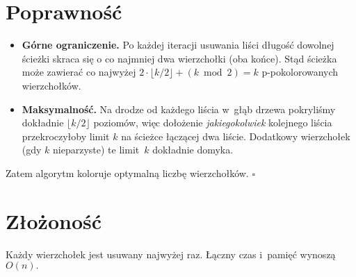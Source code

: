 \documentclass[11pt,a4paper]{article}
\begin{document}
\section*{Poprawność}

\begin{itemize}
\item
\textbf{Górne ograniczenie.}
Po każdej iteracji usuwania liści długość
dowolnej ścieżki skraca się o co najmniej
dwa wierzchołki (oba końce).
Stąd ścieżka może zawierać
co najwyżej
\(
  2\cdot\lfloor k/2\rfloor
  + (k\bmod 2) = k
\)
p-pokolorowanych wierzchołków.
\item
\textbf{Maksymalność.}
Na drodze od każdego liścia w~głąb drzewa
pokryliśmy dokładnie
$\lfloor k/2\rfloor$ poziomów,
więc dołożenie \emph{jakiegokolwiek}
kolejnego liścia przekroczyłoby limit $k$
na ścieżce łączącej dwa liście.
Dodatkowy wierzchołek (gdy $k$ nieparzyste)
te limit~$k$ dokładnie domyka.
\end{itemize}
Zatem algorytm koloruje optymalną liczbę
wierzchołków.
\hfill$\square$

\section*{Złożoność}

Każdy wierzchołek jest usuwany najwyżej raz.
Łączny czas i~pamięć wynoszą
\(
  O(n).
\)
\end{document}
